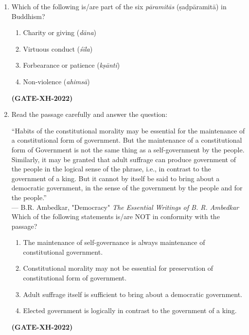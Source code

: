 \documentclass[journal]{IEEEtran}
\begin{document}
\begin{enumerate}
\item Which of the following is/are part of the six \textit{pāramitās} (ṣaḍpāramitā) in Buddhism?
\begin{multicols}{2}
\begin{enumerate}
\item Charity or giving (\textit{dāna})  
\item Virtuous conduct (\textit{śīla})  
\item Forbearance or patience (\textit{kṣānti})  
\item Non-violence (\textit{ahimsā})  
\end{enumerate}
\end{multicols}
\hfill\textbf{(GATE-XH-2022)}

\item Read the passage carefully and answer the question:

“Habits of the constitutional morality may be essential for the maintenance of a constitutional form of government. But the maintenance of a constitutional form of Government is not the same thing as a self-government by the people. Similarly, it may be granted that adult suffrage can produce government of the people in the logical sense of the phrase, i.e., in contrast to the government of a king. But it cannot by itself be said to bring about a democratic government, in the sense of the government by the people and for the people.”\\
\hfill --- B.R. Ambedkar, "Democracy" \textit{The Essential Writings of B. R. Ambedkar}\\
Which of the following statements is/are NOT in conformity with the passage?
\begin{enumerate}
\item The maintenance of self-governance is always maintenance of constitutional government.  
\item Constitutional morality may not be essential for preservation of constitutional form of government.  
\item Adult suffrage itself is sufficient to bring about a democratic government.  
\item Elected government is logically in contrast to the government of a king.  
\end{enumerate}
\hfill\textbf{(GATE-XH-2022)}


\end{enumerate}
\end{document}
